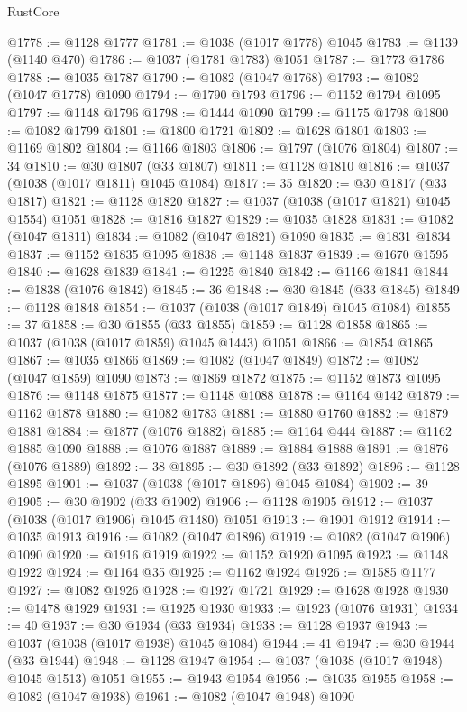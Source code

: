 \begin{lexlean}{RustCore}
\begin{coremodule}
@1778 := @1128 @1777
@1781 := @1038 (@1017 @1778) @1045
@1783 := @1139 (@1140 @470)
@1786 := @1037 (@1781 @1783) @1051
@1787 := @1773 @1786
@1788 := @1035 @1787
@1790 := @1082 (@1047 @1768)
@1793 := @1082 (@1047 @1778) @1090
@1794 := @1790 @1793
@1796 := @1152 @1794 @1095
@1797 := @1148 @1796
@1798 := @1444 @1090
@1799 := @1175 @1798
@1800 := @1082 @1799
@1801 := @1800 @1721
@1802 := @1628 @1801
@1803 := @1169 @1802
@1804 := @1166 @1803
@1806 := @1797 (@1076 @1804)
@1807 := 34
@1810 := @30 @1807 (@33 @1807)
@1811 := @1128 @1810
@1816 := @1037 (@1038 (@1017 @1811) @1045 @1084)
@1817 := 35
@1820 := @30 @1817 (@33 @1817)
@1821 := @1128 @1820
@1827 := @1037 (@1038 (@1017 @1821) @1045 @1554) @1051
@1828 := @1816 @1827
@1829 := @1035 @1828
@1831 := @1082 (@1047 @1811)
@1834 := @1082 (@1047 @1821) @1090
@1835 := @1831 @1834
@1837 := @1152 @1835 @1095
@1838 := @1148 @1837
@1839 := @1670 @1595
@1840 := @1628 @1839
@1841 := @1225 @1840
@1842 := @1166 @1841
@1844 := @1838 (@1076 @1842)
@1845 := 36
@1848 := @30 @1845 (@33 @1845)
@1849 := @1128 @1848
@1854 := @1037 (@1038 (@1017 @1849) @1045 @1084)
@1855 := 37
@1858 := @30 @1855 (@33 @1855)
@1859 := @1128 @1858
@1865 := @1037 (@1038 (@1017 @1859) @1045 @1443) @1051
@1866 := @1854 @1865
@1867 := @1035 @1866
@1869 := @1082 (@1047 @1849)
@1872 := @1082 (@1047 @1859) @1090
@1873 := @1869 @1872
@1875 := @1152 @1873 @1095
@1876 := @1148 @1875
@1877 := @1148 @1088
@1878 := @1164 @142
@1879 := @1162 @1878
@1880 := @1082 @1783
@1881 := @1880 @1760
@1882 := @1879 @1881
@1884 := @1877 (@1076 @1882)
@1885 := @1164 @444
@1887 := @1162 @1885 @1090
@1888 := @1076 @1887
@1889 := @1884 @1888
@1891 := @1876 (@1076 @1889)
@1892 := 38
@1895 := @30 @1892 (@33 @1892)
@1896 := @1128 @1895
@1901 := @1037 (@1038 (@1017 @1896) @1045 @1084)
@1902 := 39
@1905 := @30 @1902 (@33 @1902)
@1906 := @1128 @1905
@1912 := @1037 (@1038 (@1017 @1906) @1045 @1480) @1051
@1913 := @1901 @1912
@1914 := @1035 @1913
@1916 := @1082 (@1047 @1896)
@1919 := @1082 (@1047 @1906) @1090
@1920 := @1916 @1919
@1922 := @1152 @1920 @1095
@1923 := @1148 @1922
@1924 := @1164 @35
@1925 := @1162 @1924
@1926 := @1585 @1177
@1927 := @1082 @1926
@1928 := @1927 @1721
@1929 := @1628 @1928
@1930 := @1478 @1929
@1931 := @1925 @1930
@1933 := @1923 (@1076 @1931)
@1934 := 40
@1937 := @30 @1934 (@33 @1934)
@1938 := @1128 @1937
@1943 := @1037 (@1038 (@1017 @1938) @1045 @1084)
@1944 := 41
@1947 := @30 @1944 (@33 @1944)
@1948 := @1128 @1947
@1954 := @1037 (@1038 (@1017 @1948) @1045 @1513) @1051
@1955 := @1943 @1954
@1956 := @1035 @1955
@1958 := @1082 (@1047 @1938)
@1961 := @1082 (@1047 @1948) @1090

\end{coremodule}
\end{lexlean}
